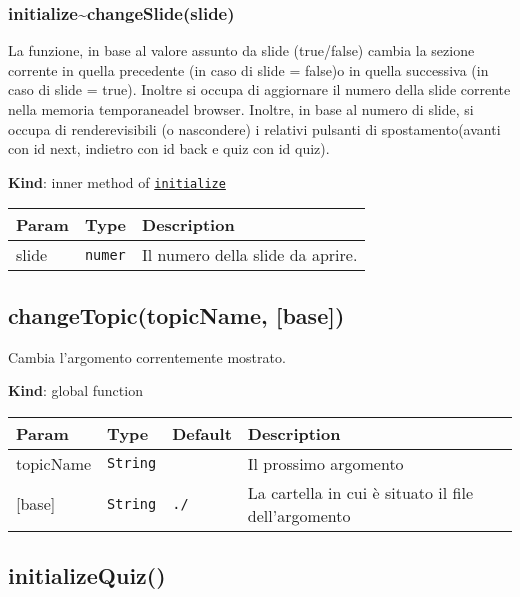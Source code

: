 \protect\hypertarget{initialize..changeSlide}{}{}

\hypertarget{initializechangeslideslide}{%
\subsubsection{initialize\textasciitilde{}changeSlide(slide)}\label{initializechangeslideslide}}

La funzione, in base al valore assunto da slide (true/false) cambia la
sezione corrente in quella precedente (in caso di slide = false)o in
quella successiva (in caso di slide = true). Inoltre si occupa di
aggiornare il numero della slide corrente nella memoria temporaneadel
browser. Inoltre, in base al numero di slide, si occupa di
renderevisibili (o nascondere) i relativi pulsanti di spostamento(avanti
con id next, indietro con id back e quiz con id quiz).

\textbf{Kind}: inner method of
\protect\hyperlink{initialize}{\texttt{initialize}}

\begin{tabularx}{\textwidth}{XXX}
\toprule
Param & Type & Description\tabularnewline
\midrule
\endhead
slide & \texttt{numer} & Il numero della slide da aprire.\tabularnewline
\bottomrule
\end{tabularx}

\protect\hypertarget{changeTopic}{}{}

\hypertarget{changetopictopicname-base}{%
\subsection{changeTopic(topicName,
{[}base{]})}\label{changetopictopicname-base}}

Cambia l'argomento correntemente mostrato.

\textbf{Kind}: global function

\begin{tabularx}{\textwidth}{XXXX}
\toprule
Param & Type & Default & Description\tabularnewline
\midrule
\endhead
topicName & \texttt{String} & & Il prossimo argomento\tabularnewline
{[}base{]} & \texttt{String} & \texttt{./} & La cartella in cui è
situato il file dell'argomento\tabularnewline
\bottomrule
\end{tabularx}

\protect\hypertarget{initializeQuiz}{}{}

\hypertarget{initializequiz}{%
\subsection{initializeQuiz()}\label{initializequiz}}

